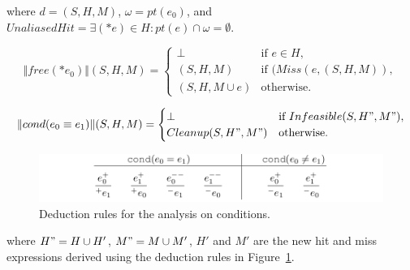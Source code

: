 where $d=(S,H,M)$, $\omega=pt(e_0)$, and 
$UnaliasedHit=\exists(*e)\in H:pt(e)\cap\omega =\emptyset$.


\[
\Vert free(*e_0) \Vert(S,H,M)=\begin{cases}
\bot& \text{if $e \in H$},\\
(S,H,M)& \text{if $(Miss(e,(S,H,M))$},\\
(S,H,M\cup {e})& \text{otherwise}.
\end{cases}
\]


\[
\Vert cond(e_0\equiv e_1)\Vert(S,H,M)=\begin{cases}
\bot& \text{if $Infeasible(S,H",M")$},\\
Cleanup(S,H",M")& \text{otherwise}.
\end{cases}
\]

\begin{figure}
  \centering
  \includegraphics[width=1.0\columnwidth]{figs/rules_cond}
   \caption{Deduction rules for the analysis on conditions.}
   \label{fig:rule_cond}
\end{figure}

where $H"=H\cup H'$, $M"=M\cup M'$, $H'$ and $M'$ are the new hit and miss 
expressions derived using the deduction rules in Figure~\ref{fig:rule_cond}.
